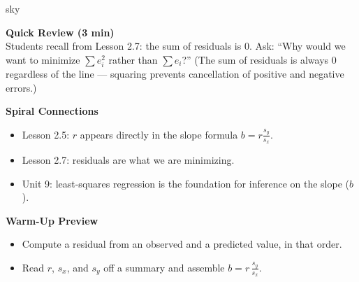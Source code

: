 \documentclass[10pt]{article}
\begin{document}
\begin{skillbox}{sky}
\begin{minipage}[t]{0.48\linewidth}
    \textbf{Quick Review (3 min)}\\
    Students recall from Lesson 2.7: the sum of residuals is 0. Ask: ``Why would we want to minimize $\sum e_i^2$ rather than $\sum e_i$?'' (The sum of residuals is always 0 regardless of the line --- squaring prevents cancellation of positive and negative errors.)

    \vspace{6pt}
    \textbf{Spiral Connections}
    \begin{itemize}
        \item Lesson 2.5: $r$ appears directly in the slope formula $b = r\frac{s_y}{s_x}$.
        \item Lesson 2.7: residuals are what we are minimizing.
        \item Unit 9: least-squares regression is the foundation for inference on the slope ($b$).
    \end{itemize}
\end{minipage}
\hfill
\begin{minipage}[t]{0.48\linewidth}
    \vspace{0pt}
    \textbf{Warm-Up Preview}
    \begin{itemize}
        \item Compute a residual from an observed and a predicted value, in that order.
        \item Read $r$, $s_x$, and $s_y$ off a summary and assemble $b = r\,\frac{s_y}{s_x}$.
    \end{itemize}
\end{minipage}
\end{skillbox}
\end{document}
